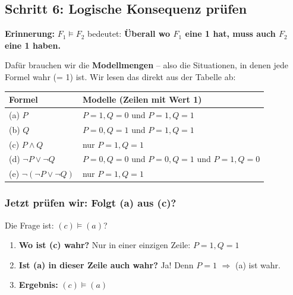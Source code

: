 \documentclass[a4paper,12pt]{article}
\begin{document}
\subsection{Schritt 6: Logische Konsequenz pr\"ufen}

\begin{merkbox}
\textbf{Erinnerung:} $F_1 \models F_2$ bedeutet: \textbf{\"Uberall wo $F_1$ eine 1 hat, muss auch $F_2$ eine 1 haben.}
\end{merkbox}

Daf\"ur brauchen wir die \textbf{Modellmengen} -- also die Situationen, in denen jede Formel wahr (= 1) ist. Wir lesen das direkt aus der Tabelle ab:

\begin{center}
\renewcommand{\arraystretch}{1.2}
\begin{tabular}{ll}
\textbf{Formel} & \textbf{Modelle} (Zeilen mit Wert 1) \\
\midrule
(a) $P$ & $P\!=\!1, Q\!=\!0$ und $P\!=\!1, Q\!=\!1$ \\
(b) $Q$ & $P\!=\!0, Q\!=\!1$ und $P\!=\!1, Q\!=\!1$ \\
(c) $P \wedge Q$ & nur $P\!=\!1, Q\!=\!1$ \\
(d) $\neg P \vee \neg Q$ & $P\!=\!0, Q\!=\!0$ und $P\!=\!0, Q\!=\!1$ und $P\!=\!1, Q\!=\!0$ \\
(e) $\neg(\neg P \vee \neg Q)$ & nur $P\!=\!1, Q\!=\!1$ \\
\end{tabular}
\end{center}

\subsubsection*{Jetzt pr\"ufen wir: Folgt (a) aus (c)?}

Die Frage ist: $(c) \models (a)$?

\begin{enumerate}
\item \textbf{Wo ist (c) wahr?} Nur in einer einzigen Zeile: $P\!=\!1, Q\!=\!1$
\item \textbf{Ist (a) in dieser Zeile auch wahr?} Ja! Denn $P = 1$ $\Rightarrow$ (a) ist wahr.
\item \textbf{Ergebnis:} $(c) \models (a)$ \checkmark
\end{enumerate}
\end{document}
